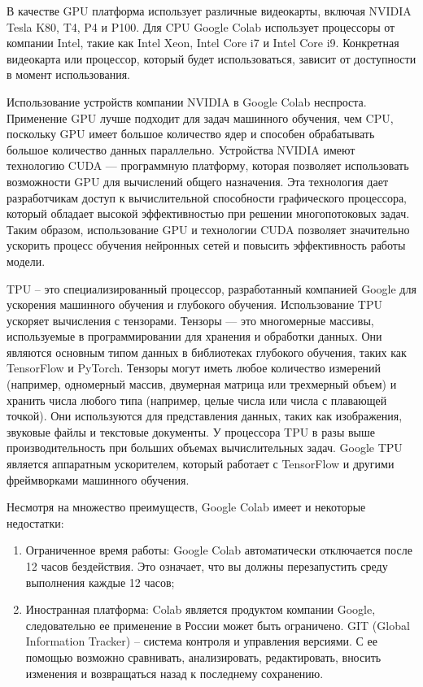     В качестве GPU платформа использует различные видеокарты, включая NVIDIA Tesla K80, T4, P4 и P100. Для CPU Google Colab использует процессоры от компании Intel, такие как Intel Xeon, Intel Core i7 и Intel Core i9. Конкретная видеокарта или процессор, который будет использоваться, зависит от доступности в момент использования.

    Использование устройств компании NVIDIA в Google Colab неспроста. Применение GPU лучше подходит для задач машинного обучения, чем CPU, поскольку GPU имеет большое количество ядер и способен обрабатывать большое количество данных параллельно. Устройства NVIDIA имеют технологию CUDA — программную платформу, которая позволяет использовать возможности GPU для вычислений общего назначения. Эта технология дает разработчикам доступ к вычислительной способности графического процессора, который обладает высокой эффективностью при решении многопотоковых задач. Таким образом, использование GPU и технологии CUDA позволяет значительно ускорить процесс обучения нейронных сетей и повысить эффективность работы модели.
    
    TPU – это специализированный процессор, разработанный компанией Google для ускорения машинного обучения и глубокого обучения. Использование TPU ускоряет вычисления с тензорами. Тензоры — это многомерные массивы, используемые в программировании для хранения и обработки данных. Они являются основным типом данных в библиотеках глубокого обучения, таких как TensorFlow и PyTorch. Тензоры могут иметь любое количество измерений (например, одномерный массив, двумерная матрица или трехмерный объем) и хранить числа любого типа (например, целые числа или числа с плавающей точкой). Они используются для представления данных, таких как изображения, звуковые файлы и текстовые документы. У процессора TPU в разы выше производительность при больших объемах вычислительных задач. Google TPU является аппаратным ускорителем, который работает с TensorFlow и другими фреймворками машинного обучения.
    
    Несмотря на множество преимуществ, Google Colab имеет и некоторые недостатки:
    \begin{enumerate}
        \item Ограниченное время работы: Google Colab автоматически отключается после 12 часов бездействия. Это означает, что вы должны перезапустить среду выполнения каждые 12 часов;
        \item Иностранная платформа: Colab является продуктом компании Google, следовательно ее применение в России может быть ограничено. GIT (Global Information Tracker) – система контроля и управления версиями. С ее помощью возможно сравнивать, анализировать, редактировать, вносить изменения и возвращаться назад к последнему сохранению.
    \end{enumerate}

